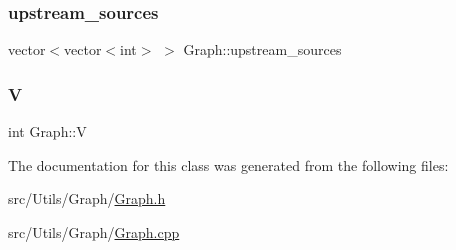 \subsubsection{\texorpdfstring{upstream\+\_\+sources}{upstream\_sources}}
{\footnotesize\ttfamily vector$<$vector$<$int$>$ $>$ Graph\+::upstream\+\_\+sources\hspace{0.3cm}{\ttfamily [protected]}}

\mbox{\label{classGraph_a2b722f7cfa7a21e4cb5fae488b3d4dcc}} 
\subsubsection{\texorpdfstring{V}{V}}
{\footnotesize\ttfamily int Graph\+::V\hspace{0.3cm}{\ttfamily [protected]}}



The documentation for this class was generated from the following files\+:\begin{DoxyCompactItemize}
\item 
src/\+Utils/\+Graph/\mbox{\hyperlink{Graph_8h}{Graph.\+h}}\item 
src/\+Utils/\+Graph/\mbox{\hyperlink{Graph_8cpp}{Graph.\+cpp}}\end{DoxyCompactItemize}
